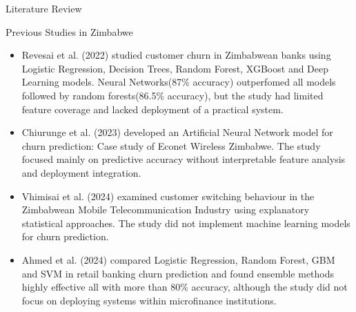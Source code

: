 \documentclass[10pt]{beamer}
\begin{document}
\begin{frame}{Literature Review}
	
	\small


		
\begin{exampleblock}{Previous Studies in Zimbabwe}
	\begin{itemize}
		
		\item Revesai et al. (2022) studied customer churn in Zimbabwean banks using Logistic Regression, Decision Trees, Random Forest, XGBoost and Deep Learning models. Neural Networks(87\% accuracy) outperfomed all models followed by random forests(86.5\% accuracy), but the study had limited feature coverage and lacked deployment of a practical system.
		
		\item Chiurunge et al. (2023) developed an Artificial Neural Network model for churn prediction: Case study of Econet Wireless Zimbabwe. The study focused mainly on predictive accuracy without interpretable feature analysis and deployment integration.
		
		\item Vhimisai et al. (2024) examined customer switching behaviour in the Zimbabwean Mobile Telecommunication Industry using explanatory statistical approaches. The study did not implement machine learning models for churn prediction.
		
		\item Ahmed et al. (2024) compared Logistic Regression, Random Forest, GBM and SVM in retail banking churn prediction and found ensemble methods highly effective all with more than 80\% accuracy, although the study did not focus on deploying systems within microfinance institutions.
		
	\end{itemize}
\end{exampleblock}
	
	\vspace{0.1cm}
	

	
\end{frame}
	
	
\end{document}
